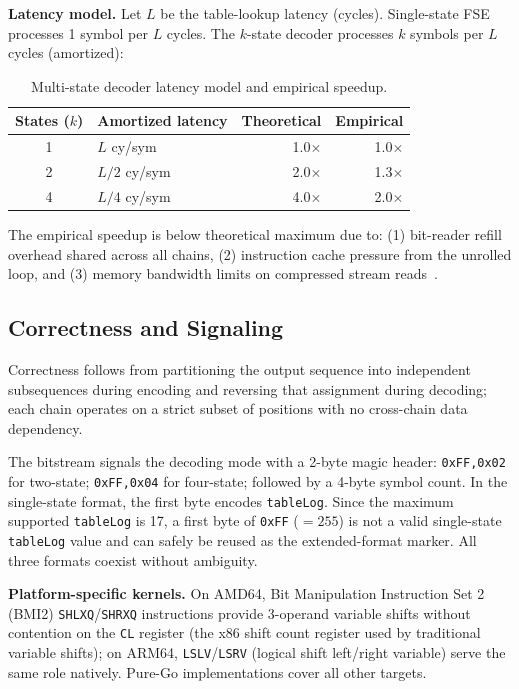 \documentclass[journal]{IEEEtran}
\begin{document}
\textbf{Latency model.} Let $L$ be the table-lookup latency (cycles).
Single-state FSE processes 1 symbol per $L$ cycles. The $k$-state decoder
processes $k$ symbols per $L$ cycles (amortized):

\begin{table}[htbp]
\centering
\caption{Multi-state decoder latency model and empirical speedup.}
\label{tab:latency}
\begin{tabular}{clrr}
\toprule
States ($k$) & Amortized latency & Theoretical & Empirical \\
\midrule
1 & $L$ cy/sym & 1.0$\times$ & 1.0$\times$ \\
2 & $L/2$ cy/sym & 2.0$\times$ & 1.3$\times$ \\
4 & $L/4$ cy/sym & 4.0$\times$ & 2.0$\times$ \\
\bottomrule
\end{tabular}
\end{table}

The empirical speedup is below theoretical maximum due to: (1) bit-reader
refill overhead shared across all chains, (2) instruction cache pressure from
the unrolled loop, and (3) memory bandwidth limits on compressed stream
reads~\cite{williams2009}.

\subsection{Correctness and Signaling}
\label{sec:signaling}

Correctness follows from partitioning the output sequence into independent
subsequences during encoding and reversing that assignment during decoding;
each chain operates on a strict subset of positions with no cross-chain data
dependency.

The bitstream signals the decoding mode with a 2-byte magic header:
\texttt{0xFF,0x02} for two-state; \texttt{0xFF,0x04} for four-state; followed
by a 4-byte symbol count. In the single-state format, the first byte encodes
\texttt{tableLog}. Since the maximum supported \texttt{tableLog} is 17, a first
byte of \texttt{0xFF} ($= 255$) is not a valid single-state \texttt{tableLog}
value and can safely be reused as the extended-format marker. All three formats
coexist without ambiguity.

\textbf{Platform-specific kernels.} On AMD64, Bit Manipulation Instruction
Set 2 (BMI2) \texttt{SHLXQ}/\texttt{SHRXQ} instructions provide 3-operand
variable shifts without contention on the \texttt{CL} register (the x86 shift
count register used by traditional variable shifts); on ARM64,
\texttt{LSLV}/\texttt{LSRV} (logical shift left/right variable) serve the same
role natively. Pure-Go implementations cover all other targets.
\end{document}
